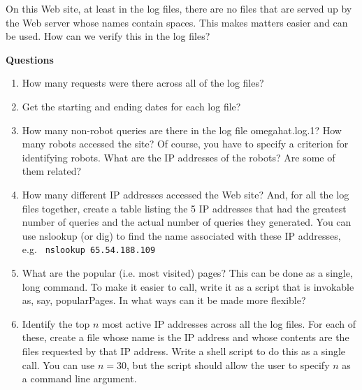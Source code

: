 \documentclass[12pt]{article}
\begin{document}
On this Web site, at least in the log files, there are no files  
that are served up by the Web server
whose names contain spaces. 
This makes matters easier and can be used.
How can we verify this in the log files?

\textbf{Questions}
\begin{enumerate}
\item How many requests were there across all of the log files?

\item Get the starting and ending dates for each log file?


\item  How many non-robot queries are there in the log file omegahat.log.1?
How many robots accessed the site?  Of course, you have to
  specify a criterion for identifying robots.  What are the IP
  addresses of the robots? Are some of them related? %

% 
%
%

\item How many different  IP addresses accessed the Web site?
And, for all the log files together,  create a table listing the 5 IP addresses that had
the greatest number of queries and the actual number of queries
they generated.
You can use nslookup (or dig) to find the name associated with these IP
addresses,
e.g. \verb+ nslookup 65.54.188.109+


\item What are the popular (i.e. most visited) pages? 
This can be done as a single,  long  command.
To make it easier to call, write it as a script
that is invokable as, say, popularPages.
In what ways can it be made  more flexible?


\item Identify the top $n$  most active IP addresses across all the
  log files.   For each of these, create a file whose name is the IP address
  and whose contents are the files requested by that IP address.
  Write a shell script to do this as a single call. 
  You can use $n  = 30$, but the script should allow the user to
  specify $n$ as a command line argument. 



\end{enumerate}
\end{document}
